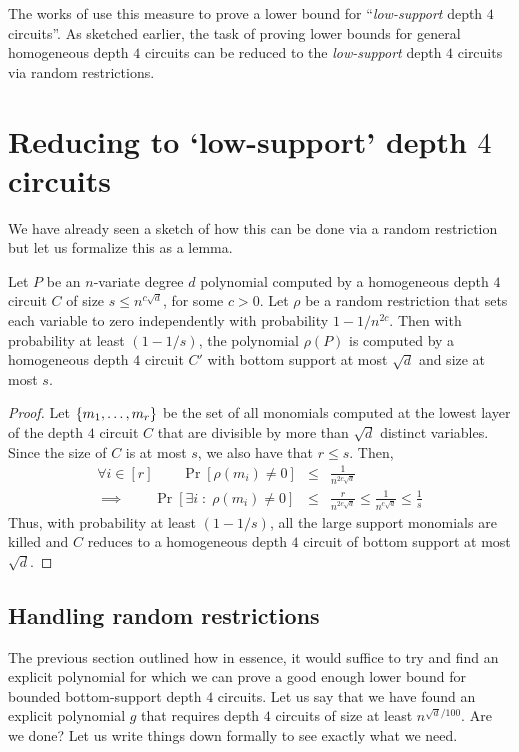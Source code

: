 The works of \cite{KLSS,KS14} use this measure to prove a lower bound for ``\emph{low-support} depth $4$ circuits''. 
As sketched earlier, the task of proving lower bounds for general homogeneous depth $4$ circuits can be reduced to the \emph{low-support} depth $4$ circuits via random restrictions. 

\section{Reducing to `low-support' depth $4$ circuits}\label{sec:red-to-low-support}

We have already seen a sketch of how this can be done via a random restriction but let us formalize this as a lemma. 

\begin{lemma}\label{lem:red-to-low-supp}
Let $P$ be an $n$-variate degree $d$ polynomial computed by a homogeneous depth $4$ circuit $C$ of size $s \leq n^{c\sqrt{d}}$, for some $c>0$. 
Let $\rho$ be a random restriction that sets each variable to zero independently with probability $1 - 1/n^{2c}$. 
Then with probability at least $(1 - 1/s)$, the polynomial $\rho(P)$ is computed by a homogeneous depth $4$ circuit $C'$ with bottom support at most $\sqrt{d}$ and size at most $s$. 
\end{lemma}
\begin{proof}
Let $\left\{m_1,\dots, m_r\right\}$ be the set of all monomials computed at the lowest layer of the depth $4$ circuit $C$ that are divisible by more than $\sqrt{d}$ distinct variables. 
Since the size of $C$ is at most $s$, we also have that $r\leq s$. 
Then,
\begin{eqnarray*}
\forall i\in [r] \qquad \Pr[\rho(m_i) \neq 0] & \leq & \frac{1}{n^{2c\sqrt{d}}}\\
\implies \qquad \Pr[\exists i \;:\; \rho(m_i) \neq 0] & \leq & \frac{r}{n^{2c\sqrt{d}}} \leq \frac{1}{n^{c\sqrt{d}}} \leq \frac{1}{s}
\end{eqnarray*}
Thus, with probability at least $(1 - 1/s)$, all the large support monomials are killed and $C$ reduces to a homogeneous depth $4$ circuit of bottom support at most $\sqrt{d}$. 
\end{proof}

\subsection{Handling random restrictions}

The previous section outlined how in essence, it would suffice to try and find an explicit polynomial for which we can prove a good enough lower bound for bounded bottom-support depth $4$ circuits. 
Let us say that we have found an explicit polynomial $g$ that requires depth $4$ circuits of size at least $n^{\sqrt{d}/100}$. 
Are we done? Let us write things down formally to see exactly what we need. 

